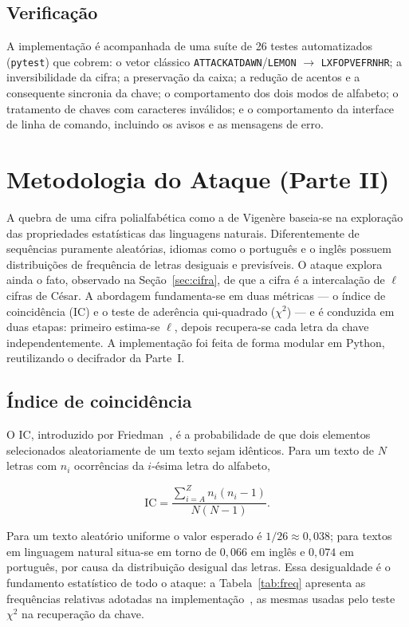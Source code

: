 \documentclass[conference]{IEEEtran}
\begin{document}
\subsection{Verificação}
A implementação é acompanhada de uma suíte de 26 testes automatizados
(\texttt{pytest}) que cobrem: o vetor clássico
\texttt{ATTACKATDAWN}/\texttt{LEMON} $\rightarrow$ \texttt{LXFOPVEFRNHR};
a inversibilidade da cifra; a preservação da caixa; a redução de acentos e a
consequente sincronia da chave; o comportamento dos dois modos de alfabeto; o
tratamento de chaves com caracteres inválidos; e o comportamento da interface
de linha de comando, incluindo os avisos e as mensagens de erro.

\section{Metodologia do Ataque (Parte II)}
\label{sec:ataque}
A quebra de uma cifra polialfabética como a de Vigenère baseia-se na exploração
das propriedades estatísticas das linguagens naturais. Diferentemente de
sequências puramente aleatórias, idiomas como o português e o inglês possuem
distribuições de frequência de letras desiguais e previsíveis. O ataque explora
ainda o fato, observado na Seção~\ref{sec:cifra}, de que a cifra é a
intercalação de $\ell$ cifras de César. A abordagem fundamenta-se em duas
métricas --- o índice de coincidência (IC) e o teste de aderência
qui-quadrado ($\chi^2$) --- e é conduzida em duas etapas: primeiro estima-se
$\ell$, depois recupera-se cada letra da chave independentemente. A
implementação foi feita de forma modular em Python, reutilizando o decifrador
da Parte~I.

\subsection{Índice de coincidência}
O IC, introduzido por Friedman~\cite{friedman}, é a probabilidade de que dois
elementos selecionados aleatoriamente de um texto sejam idênticos. Para um
texto de $N$ letras com $n_i$ ocorrências da $i$-ésima letra do alfabeto,

\begin{equation}
\mathrm{IC} = \frac{\sum_{i=A}^{Z} n_i (n_i - 1)}{N (N-1)}.
\label{eq:ic}
\end{equation}

Para um texto aleatório uniforme o valor esperado é $1/26 \approx 0{,}038$;
para textos em linguagem natural situa-se em torno de $0{,}066$ em inglês e
$0{,}074$ em português, por causa da distribuição desigual das letras.
Essa desigualdade é o fundamento estatístico de todo o ataque: a
Tabela~\ref{tab:freq} apresenta as frequências relativas adotadas na
implementação~\cite{wikipedia_freq}, as mesmas usadas pelo teste
$\chi^2$ na recuperação da chave.
\end{document}
